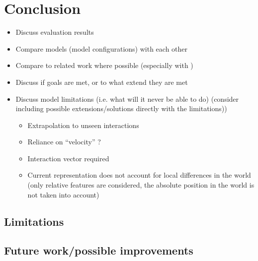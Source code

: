 \chapter{Conclusion \label{chap:conclusion}}



\begin{itemize}
	\item Discuss evaluation results
	\item Compare models (model configurations) with each other
	\item Compare to related work where possible (especially with \cite{pushing})
	\item Discuss if goals are met, or to what extend they are met
	\item Discuss model limitations (i.e. what will it never be able to do) (consider including possible extensions/solutions directly with the limitations))
	\begin{itemize}
		\item Extrapolation to unseen interactions
		\item Reliance on \enquote{velocity} ?
		\item Interaction vector required
		\item Current representation does not account for local differences in the world (only relative features are considered, the absolute position in the world is not taken into account)
	\end{itemize}
\end{itemize}

\section{Limitations}

\section{Future work/possible improvements}